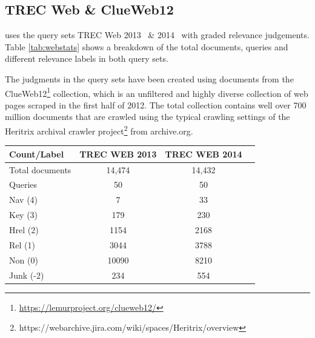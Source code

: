 \subsection{TREC Web \& ClueWeb12 }\label{sec:trecclue}
\datasetname uses the query sets TREC Web 2013~\cite{collins2013trec} \& 2014~\cite{collins2015trec} with graded relevance judgements. Table \ref{tab:webstats} shows a breakdown of the total documents, queries and different relevance labels in both query sets. 

The judgments in the query sets have been created using documents from the  ClueWeb12\footnote{\url{https://lemurproject.org/clueweb12/}} collection, which is an unfiltered and highly diverse collection of web pages scraped in the first half of 2012. The total collection contains well over 700 million documents that are crawled using the typical crawling settings of the Heritrix archival crawler project\footnote{https://webarchive.jira.com/wiki/spaces/Heritrix/overview} from archive.org.  

\begin{center}
  \begin{tabular}{ l | c | c | c }
    Count/Label & TREC WEB 2013 & TREC WEB 2014 \\
    \hline
    Total documents & 14,474 & 14,432 \\
    Queries & 50 & 50 \\
    Nav (4) & 7 & 33 \\
    Key (3) & 179 & 230 \\
    Hrel (2) & 1154 & 2168 \\
    Rel (1) & 3044 & 3788 \\
    Non (0) & 10090 & 8210 \\
    Junk (-2) & 234 & 554 \\
    \hline
  \end{tabular}
   \label{tab:webstats} 
\end{center}

